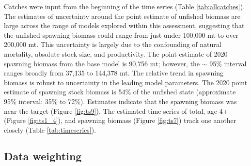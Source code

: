 \documentclass[11pt,
  english,
  a4paper,
]{article}
\begin{document}
\leavevmode\tagmcend\tagstructend\par


Catches were input from the beginning of the time series (Table \ref{tab:allcatches}). The estimates of uncertainty around the point estimate of unfished biomass are large across the range of models explored within this assessment, suggesting that the unfished spawning biomass could range from just under 100,000 mt to over 200,000 mt. This uncertainty is largely due to the confounding of natural mortality, absolute stock size, and productivity. The point estimate of 2020 spawning biomass from the base model is 90,756 mt; however, the {\(\sim\)\leavevmode\tagmcend\tagstructend} 95\% interval ranges broadly from 37,135 to 144,378 mt. The relative trend in spawning biomass is robust to uncertainty in the leading model parameters. The 2020 point estimate of spawning stock biomass is 54\% of the unfished state (approximate 95\% interval: 35\% to 72\%). Estimates indicate that the spawning biomass was near the target (Figure \ref{fig:ts9}). The estimated time-series of total, age-4+ (Figure \ref{fig:ts1_4}), and spawning biomass (Figure \ref{fig:ts7}) track one another closely (Table \ref{tab:timeseries}).

\leavevmode\tagmcend\tagstructend\par

\hypertarget{dw}{%
\subsection{Data weighting}\label{dw}}

\leavevmode\tagmcend\tagstructend
\end{document}
